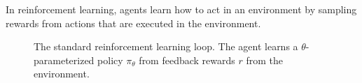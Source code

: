In reinforcement learning, agents learn how to act in an
environment by sampling rewards from actions that are executed in the environment. %
%
%
%






%






\begin{figure}
  \begin{center}
    
    \caption{The standard reinforcement learning loop. The agent learns a $\theta$-parameterized policy $\pi_\theta$ from feedback rewards $r$ from the environment. \citep{sutton2018reinforcement}}\label{fig:rl7b}
  \end{center}
\end{figure}

